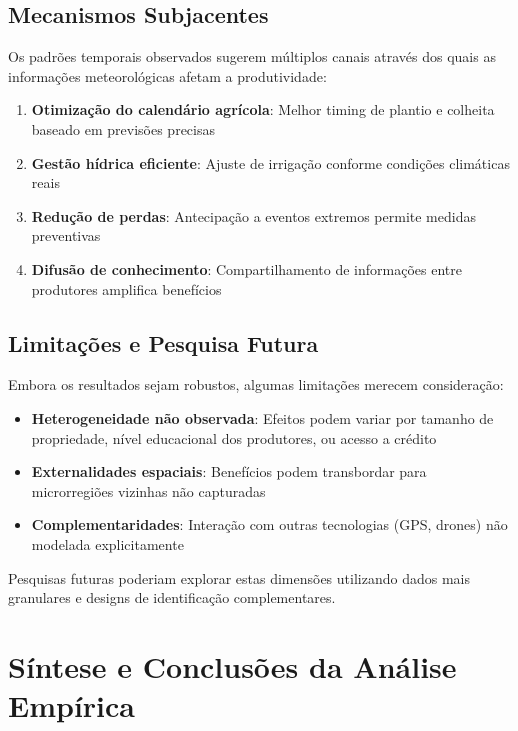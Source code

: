 \documentclass[
	12pt,				%
	openright,			%
	oneside,			%
	a4paper,			%
	english,			%
	french,				%
	spanish,			%
	brazil				%
	]{abntex2}
\begin{document}
\subsection{Mecanismos Subjacentes}

Os padrões temporais observados sugerem múltiplos canais através dos quais as informações meteorológicas afetam a produtividade:

\begin{enumerate}
\item \textbf{Otimização do calendário agrícola}: Melhor timing de plantio e colheita baseado em previsões precisas

\item \textbf{Gestão hídrica eficiente}: Ajuste de irrigação conforme condições climáticas reais

\item \textbf{Redução de perdas}: Antecipação a eventos extremos permite medidas preventivas

\item \textbf{Difusão de conhecimento}: Compartilhamento de informações entre produtores amplifica benefícios
\end{enumerate}

\subsection{Limitações e Pesquisa Futura}

Embora os resultados sejam robustos, algumas limitações merecem consideração:

\begin{itemize}
\item \textbf{Heterogeneidade não observada}: Efeitos podem variar por tamanho de propriedade, nível educacional dos produtores, ou acesso a crédito

\item \textbf{Externalidades espaciais}: Benefícios podem transbordar para microrregiões vizinhas não capturadas

\item \textbf{Complementaridades}: Interação com outras tecnologias (GPS, drones) não modelada explicitamente
\end{itemize}

Pesquisas futuras poderiam explorar estas dimensões utilizando dados mais granulares e designs de identificação complementares.

\section{Síntese e Conclusões da Análise Empírica}
\end{document}
